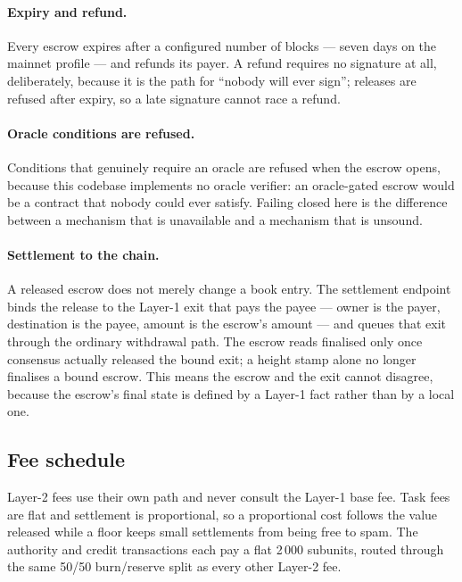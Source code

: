 \documentclass{article}
\begin{document}
\paragraph{Expiry and refund.} Every escrow expires after a configured number
of blocks --- seven days on the mainnet profile --- and refunds its payer. A
refund requires no signature at all, deliberately, because it is the path for
``nobody will ever sign''; releases are refused after expiry, so a late
signature cannot race a refund.

\paragraph{Oracle conditions are refused.} Conditions that genuinely require an
oracle are refused when the escrow opens, because this codebase implements no
oracle verifier: an oracle-gated escrow would be a contract that nobody could
ever satisfy. Failing closed here is the difference between a mechanism that
is unavailable and a mechanism that is unsound.

\paragraph{Settlement to the chain.} A released escrow does not merely change
a book entry. The settlement endpoint binds the release to the Layer-1 exit
that pays the payee --- owner is the payer, destination is the payee, amount is
the escrow's amount --- and queues that exit through the ordinary withdrawal
path. The escrow reads finalised only once consensus actually released the
bound exit; a height stamp alone no longer finalises a bound escrow. This
means the escrow and the exit cannot disagree, because the escrow's final
state is defined by a Layer-1 fact rather than by a local one.

\subsection{Fee schedule}

Layer-2 fees use their own path and never consult the Layer-1 base fee. Task
fees are flat and settlement is proportional, so a proportional cost follows the
value released while a floor keeps small settlements from being free to spam. The
authority and credit transactions each pay a flat 2\,000 subunits, routed through
the same 50/50 burn/reserve split as every other Layer-2 fee.
\end{document}
